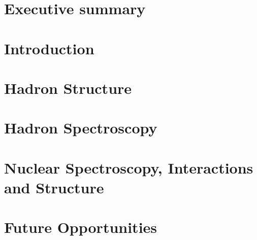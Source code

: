 \maketitle


\section*{Executive summary}


\section{Introduction}
\label{sec:intro}


\section{Hadron Structure}
\label{sec:hadronstructure}


\section{Hadron Spectroscopy}
\label{sec:hadronspectroscopy}


\section{Nuclear Spectroscopy, Interactions and Structure}
\label{sec:nuclear}


\section{Future Opportunities}
\label{sec:future}






